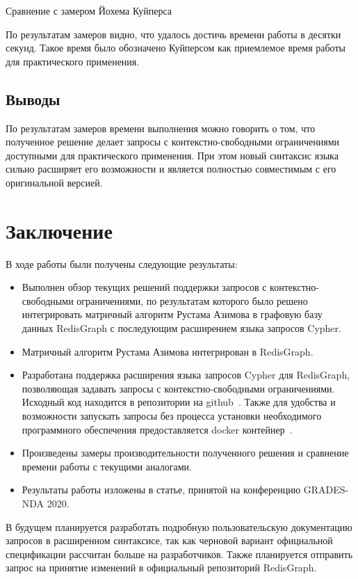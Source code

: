 \begin{table}[h!]
\begin{adjustbox}{max width=\textwidth}

\end{adjustbox}
\caption{Сравнение с замером Йохема Куйперса}
\label{tab:neo4j-vs-redisgraph}
\end{table}

По результатам замеров видно, что удалось достичь времени работы в десятки секунд. Такое время было обозначено Куйперсом как приемлемое время работы для практического применения.


\subsection{Выводы}
По результатам замеров времени выполнения можно говорить о том, что полученное решение делает запросы с контекстно-свободными ограничениями доступными для практического применения. При этом новый синтаксис языка сильно расширяет его возможности и является полностью совместимым с его оригинальной версией.

\section*{Заключение}
В ходе работы были получены следующие результаты:
\begin{itemize}
\item Выполнен обзор текущих решений поддержки запросов с кон\-текстно-свободными ограничениями, по результатам которого было решено интегрировать матричный алгоритм Рустама Азимова в графовую базу данных RedisGraph с последующим расширением языка запросов Cypher. 
\item Матричный алгоритм Рустама Азимова интегрирован в RedisGraph.
\item Разработана поддержка расширения языка запросов Cypher для RedisGraph, позволяющая задавать запросы с конте\-кстно-сво\-бод\-ными ограничениями. Исходный код находится в репозитории на github~\cite{github}. Также для удобства и возможности запускать запросы без процесса установки необходимого программного обеспечения предоставляется docker контейнер~\cite{docker}.
\item Произведены замеры производительности полученного решения и сравнение времени работы с текущими аналогами.
\item Результаты работы изложены в статье, принятой на конференцию GRADES-NDA 2020.
\end{itemize}

В будущем планируется разработать подробную пользовательскую документацию запросов в расширенном синтаксисе, так как черновой вариант официальной спецификации рассчитан больше на разработчиков. Также планируется отправить запрос на принятие изменений в официальный репозиторий RedisGraph. 

%
%
%
